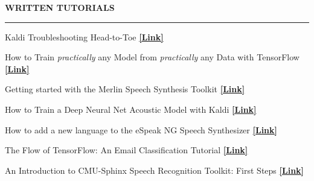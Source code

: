 \documentclass{resume} %
\begin{document}
\vspace{.5cm}
\begin{minipage}{\textwidth}
\sectionskip
\MakeUppercase{\textbf{Written Tutorials}}
  \sectionlineskip
  \hrule
\vspace{.5cm}

{Kaldi Troubleshooting Head-to-Toe} \hfill \href{http://jrmeyer.github.io/asr/2019/08/17/Kaldi-troubleshooting.html}{\textbf{[Link]}}%

\vspace{.25cm}

{How to Train \textit{practically} any Model from \textit{practically} any Data with TensorFlow} \hfill \href{http://jrmeyer.github.io/machinelearning/2019/05/29/tensorflow-dataset-estimator-api.html}{\textbf{[Link]}}%

\vspace{.25cm}

{Getting started with the Merlin Speech Synthesis Toolkit} \hfill \href{http://jrmeyer.github.io/tts/2017/02/14/Installing-Merlin.html}{\textbf{[Link]}}%
\vspace{.25cm}

{How to Train a Deep Neural Net Acoustic Model with Kaldi} \hfill \href{http://jrmeyer.github.io/asr/2016/12/15/DNN-AM-Kaldi.html}{\textbf{[Link]}}%
\vspace{.25cm}

{How to add a new language to the eSpeak NG Speech Synthesizer} \hfill \href{http://jrmeyer.github.io/tts/2016/07/03/How-to-Add-a-Language-to-eSpeak-NG.html}{\textbf{[Link]}}%
\vspace{.25cm}

{The Flow of TensorFlow: An Email Classification Tutorial} \hfill \href{http://jrmeyer.github.io/machinelearning/2016/02/01/TensorFlow-Tutorial.html}{\textbf{[Link]}}%
\vspace{.25cm}

{An Introduction to CMU-Sphinx Speech Recognition Toolkit: First Steps} \hfill \href{http://jrmeyer.github.io/asr/2016/01/09/Installing-CMU-Sphinx-on-Ubuntu.html}{\textbf{[Link]}}%

\end{minipage}


\end{document}

